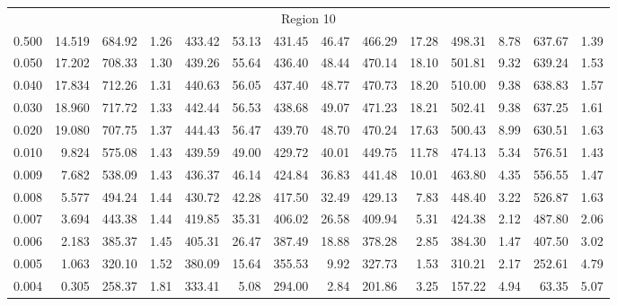 \begin{tabular}{@{}lrrrrrrrrrrrrr@{}}
\midrule
\multicolumn{14}{c}{Region 10} \\
\cmidrule{1-14}
0.500 & 14.519 & 684.92 & 1.26 & 433.42 & 53.13 & 431.45 & 46.47 & 466.29 & 17.28 & 498.31 & 8.78 & 637.67 & 1.39 \\
0.050 & 17.202 & 708.33 & 1.30 & 439.26 & 55.64 & 436.40 & 48.44 & 470.14 & 18.10 & 501.81 & 9.32 & 639.24 & 1.53 \\
0.040 & 17.834 & 712.26 & 1.31 & 440.63 & 56.05 & 437.40 & 48.77 & 470.73 & 18.20 & 510.00 & 9.38 & 638.83 & 1.57 \\
0.030 & 18.960 & 717.72 & 1.33 & 442.44 & 56.53 & 438.68 & 49.07 & 471.23 & 18.21 & 502.41 & 9.38 & 637.25 & 1.61 \\
0.020 & 19.080 & 707.75 & 1.37 & 444.43 & 56.47 & 439.70 & 48.70 & 470.24 & 17.63 & 500.43 & 8.99 & 630.51 & 1.63 \\
0.010 & 9.824 & 575.08 & 1.43 & 439.59 & 49.00 & 429.72 & 40.01 & 449.75 & 11.78 & 474.13 & 5.34 & 576.51 & 1.43 \\
0.009 & 7.682 & 538.09 & 1.43 & 436.37 & 46.14 & 424.84 & 36.83 & 441.48 & 10.01 & 463.80 & 4.35 & 556.55 & 1.47 \\
0.008 & 5.577 & 494.24 & 1.44 & 430.72 & 42.28 & 417.50 & 32.49 & 429.13 & 7.83 & 448.40 & 3.22 & 526.87 & 1.63 \\
0.007 & 3.694 & 443.38 & 1.44 & 419.85 & 35.31 & 406.02 & 26.58 & 409.94 & 5.31 & 424.38 & 2.12 & 487.80 & 2.06 \\
0.006 & 2.183 & 385.37 & 1.45 & 405.31 & 26.47 & 387.49 & 18.88 & 378.28 & 2.85 & 384.30 & 1.47 & 407.50 & 3.02 \\
0.005 & 1.063 & 320.10 & 1.52 & 380.09 & 15.64 & 355.53 & 9.92 & 327.73 & 1.53 & 310.21 & 2.17 & 252.61 & 4.79 \\
0.004 & 0.305 & 258.37 & 1.81 & 333.41 & 5.08 & 294.00 & 2.84 & 201.86 & 3.25 & 157.22 & 4.94 & 63.35 & 5.07 \\

\bottomrule
\end{tabular}
